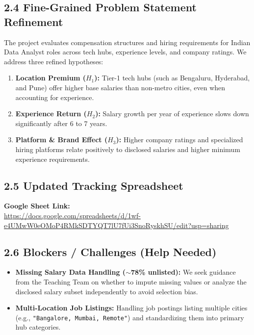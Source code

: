 \documentclass[11pt, a4paper]{article}
\begin{document}
\subsection*{2.4 Fine-Grained Problem Statement Refinement}
The project evaluates compensation structures and hiring requirements for Indian Data Analyst roles across tech hubs, experience levels, and company ratings. We address three refined hypotheses:
\begin{enumerate}
    \item \textbf{Location Premium ($H_1$):} Tier-1 tech hubs (such as Bengaluru, Hyderabad, and Pune) offer higher base salaries than non-metro cities, even when accounting for experience.
    \item \textbf{Experience Return ($H_2$):} Salary growth per year of experience slows down significantly after 6 to 7 years.
    \item \textbf{Platform \& Brand Effect ($H_3$):} Higher company ratings and specialized hiring platforms relate positively to disclosed salaries and higher minimum experience requirements.
\end{enumerate}

\subsection*{2.5 Updated Tracking Spreadsheet}
\textbf{Google Sheet Link:}\\
\url{https://docs.google.com/spreadsheets/d/1wf-e4UMwW0eOMoP4RMkSDTYQT7lU7fUi3SnoRyskhSU/edit?usp=sharing}

\subsection*{2.6 Blockers / Challenges (Help Needed)}
\begin{itemize}
    \item \textbf{Missing Salary Data Handling ($\sim$78\% unlisted):} We seek guidance from the Teaching Team on whether to impute missing values or analyze the disclosed salary subset independently to avoid selection bias.
    \item \textbf{Multi-Location Job Listings:} Handling job postings listing multiple cities (e.g., \texttt{"Bangalore, Mumbai, Remote"}) and standardizing them into primary hub categories.
\end{itemize}
\end{document}
